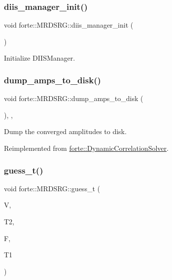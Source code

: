 \subsubsection{\texorpdfstring{diis\+\_\+manager\+\_\+init()}{diis\_manager\_init()}}
{\footnotesize\ttfamily void forte\+::\+M\+R\+D\+S\+R\+G\+::diis\+\_\+manager\+\_\+init (\begin{DoxyParamCaption}{ }\end{DoxyParamCaption})\hspace{0.3cm}{\ttfamily [protected]}}



Initialize D\+I\+I\+S\+Manager. 

\mbox{\label{classforte_1_1_m_r_d_s_r_g_aee87aff2861a0aa4be1d6486d7054049}} 
\subsubsection{\texorpdfstring{dump\+\_\+amps\+\_\+to\+\_\+disk()}{dump\_amps\_to\_disk()}}
{\footnotesize\ttfamily void forte\+::\+M\+R\+D\+S\+R\+G\+::dump\+\_\+amps\+\_\+to\+\_\+disk (\begin{DoxyParamCaption}{ }\end{DoxyParamCaption})\hspace{0.3cm}{\ttfamily [override]}, {\ttfamily [protected]}, {\ttfamily [virtual]}}



Dump the converged amplitudes to disk. 



Reimplemented from \mbox{\hyperlink{classforte_1_1_dynamic_correlation_solver_a504b343c559a62b9d13ecf8cec44f3d2}{forte\+::\+Dynamic\+Correlation\+Solver}}.

\mbox{\label{classforte_1_1_m_r_d_s_r_g_ab2332cf8aaa8bdea5cd85618a98eddeb}} 
\subsubsection{\texorpdfstring{guess\+\_\+t()}{guess\_t()}}
{\footnotesize\ttfamily void forte\+::\+M\+R\+D\+S\+R\+G\+::guess\+\_\+t (\begin{DoxyParamCaption}\item[{Blocked\+Tensor \&}]{V,  }\item[{Blocked\+Tensor \&}]{T2,  }\item[{Blocked\+Tensor \&}]{F,  }\item[{Blocked\+Tensor \&}]{T1 }\end{DoxyParamCaption})\hspace{0.3cm}{\ttfamily [protected]}}



